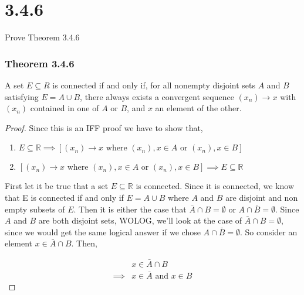 \documentclass{article}
\begin{document}
\section*{3.4.6}
Prove Theorem 3.4.6
\subsubsection*{\textbf{Theorem 3.4.6}}
A set $E \subseteq R$ is connected if and only if, for all nonempty
disjoint sets $A$ and $B$ satisfying $E = A \cup B$, there always exists a convergent sequence $(x_n) \rightarrow x$ with $(x_n)$ contained in one of $A$ or $B$, and $x$ an element of the other.

\begin{proof}
Since this is an IFF proof we have to show that,
\begin{enumerate}
\item $E \subseteq \mathbb{R} \implies [(x_n) \rightarrow x  \text{ where } (x_n),x \in A \text{ or } (x_n),x \in B]$
\item $[(x_n) \rightarrow x \text{ where } (x_n),x \in A \text{ or } (x_n),x \in B] \implies  E \subseteq \mathbb{R}$
\end{enumerate}


First let it be true that a set $E \subseteq \mathbb{R}$ is connected. Since it is connected, we know that E is connected if and only if $E = A \cup B$ where $A$ and $B$ are disjoint and non empty subsets of $E$. Then it is either the case that $\bar{A} \cap B = \emptyset$ or $A \cap \bar{B} = \emptyset$. Since $A$ and $B$ are both disjoint sets, WOLOG, we'll look at the case of $\bar{A} \cap B = \emptyset$, since we would get the same logical answer if we chose $A \cap \bar{B} = \emptyset$. So consider an element $x \in \bar{A} \cap B$. Then,

\begin{equation} \label{eq1}
\begin{split}
 & x \in  \bar{A} \cap B\\
\implies & x \in \bar{A}  \text{ and }  x \in B
\end{split}
\end{equation}


\end{proof}
\end{document}
